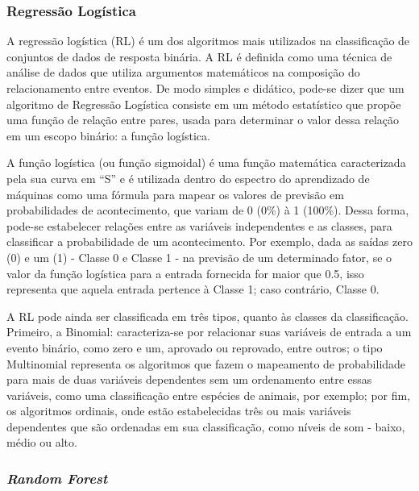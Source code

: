 \subsubsection{Regressão Logística}

A regressão logística (RL) é um dos algoritmos mais utilizados na classificação de conjuntos de dados de resposta binária. A RL é definida como uma técnica de análise de dados que utiliza argumentos matemáticos na composição do relacionamento entre eventos. De modo simples e didático, pode-se dizer que um algoritmo de Regressão Logística consiste em um método estatístico que propõe uma função de relação entre pares, usada para determinar o valor dessa relação em um escopo binário: a função logística.

A função logística (ou função sigmoidal) é uma função matemática caracterizada pela sua curva em ``S'' e é utilizada dentro do espectro do aprendizado de máquinas como uma fórmula para mapear os valores de previsão em probabilidades de acontecimento, que variam de 0 (0\%) à 1 (100\%). Dessa forma, pode-se estabelecer relações entre as variáveis independentes e as classes, para classificar a probabilidade de um acontecimento. Por exemplo, dada as saídas zero (0) e um (1) - Classe 0 e Classe 1 -  na previsão de um determinado fator, se o valor da função logística para a entrada fornecida for maior que 0.5, isso representa que aquela entrada pertence à Classe 1; caso contrário, Classe 0.

A RL pode ainda ser classificada em três tipos, quanto às classes da classificação. Primeiro, a Binomial: caracteriza-se por relacionar suas variáveis de entrada a um evento binário, como zero e um, aprovado ou reprovado, entre outros; o tipo Multinomial representa os algoritmos que fazem o mapeamento de probabilidade para mais de duas variáveis dependentes sem um ordenamento entre essas variáveis, como uma classificação entre espécies de animais, por exemplo; por fim, os algoritmos ordinais, onde estão estabelecidas três ou mais variáveis dependentes que são ordenadas em sua classificação, como níveis de som - baixo, médio ou alto.

\subsubsection{ \textit{Random Forest}}


